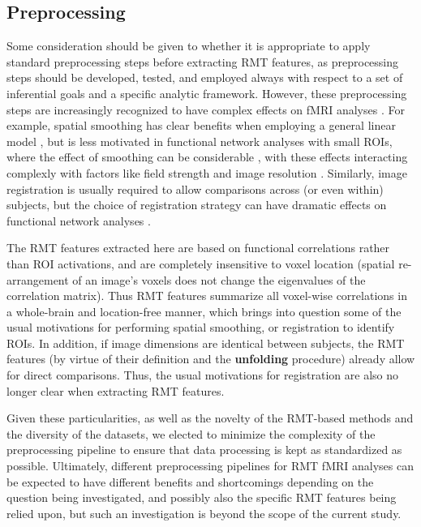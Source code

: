 \documentclass[10pt]{article}
\begin{document}
\subsection{Preprocessing}
Some consideration should be given to whether it is appropriate to apply standard preprocessing
steps before extracting RMT features, as preprocessing steps should be developed, tested, and
employed always with respect to a set of inferential goals and a specific analytic framework.
However, these preprocessing steps are increasingly recognized to have complex effects on fMRI
analyses \citep{parkerBenefitSliceTiming2019}. For example, spatial smoothing has clear benefits
when employing a general linear model
\citep{miklEffectsSpatialSmoothing2008,alakorkkoEffectsSpatialSmoothing2017,worsleyAnalysisFMRITimeSeries1995},
but is less motivated in functional network analyses with small ROIs, where the effect of smoothing
can be considerable
\citep{alakorkkoEffectsSpatialSmoothing2017,goelmanMaximizingNegativeCorrelations2014,trianaEffectsSpatialSmoothing2020},
with these effects interacting complexly with factors like field strength and image resolution
\citep{triantafyllouEffectSpatialSmoothing2006}. Similarly, image registration is usually required
to allow comparisons across (or even within) subjects, but the choice of registration strategy can
have dramatic effects on functional network analyses \citep{magalhaesImpactNormalizationSegmentation2014}.

The RMT features extracted here are based on functional correlations rather than ROI activations,
and are completely insensitive to voxel location (spatial re-arrangement of an image’s voxels does
not change the eigenvalues of the correlation matrix). Thus RMT features summarize all voxel-wise
correlations in a whole-brain and location-free manner, which brings into question some of the usual
motivations for performing spatial smoothing, or registration to identify ROIs. In addition, if
image dimensions are identical between subjects, the RMT features (by virtue of their definition and
the \textbf{unfolding} procedure) already allow for direct comparisons. Thus, the usual motivations for
registration are also no longer clear when extracting RMT features.

Given these particularities, as well as the novelty of the RMT-based methods and the diversity of
the datasets, we elected to minimize the complexity of the preprocessing pipeline to ensure that
data processing is kept as standardized as possible. Ultimately, different preprocessing pipelines
for RMT fMRI analyses can be expected to have different benefits and shortcomings depending on the
question being investigated, and possibly also the specific RMT features being relied upon, but such
an investigation is beyond the scope of the current study.
\end{document}
